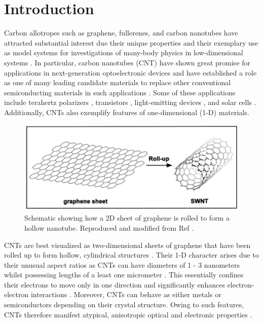 \chapter{Introduction}

Carbon allotropes such as graphene, fullerenes, and carbon nanotubes have attracted substantial interest due their unique properties and their exemplary use as model systems for investigations of many-body physics in low-dimensional systems \cite{zaytseva2016carbon, nanot2012optoelectronic, soavi2016ultrafast}. In particular, carbon nanotubes (CNT) have shown great promise for applications in next-generation optoelectronic devices and have established a role as one of many leading candidate materials to replace other conventional semiconducting materials in such applications \cite{nanot2012optoelectronic}. Some of these applications include terahertz polarizers \cite{ren2009carbon}, transistors \cite{qiu2017scaling}, light-emitting devices \cite{liu2015electrically}, and solar cells \cite{kongkanand2007single}. Additionally, CNTs also exemplify features of one-dimensional (1-D) materials. 

\begin{figure}[H]
	\centering
	\includegraphics[scale=0.8]{images/chapter_intro/rolled_up_graphene.png}
	\caption{Schematic showing how a 2D sheet of graphene is rolled to form a hollow nanotube. Reproduced and modified from Ref \cite{odom2000structure}.}
\end{figure}

CNTs are best visualized as two-dimensional sheets of graphene that have been rolled up to form hollow, cylindrical structures \cite{odom2000structure,charlier2007electronic}. Their 1-D character arises due to their unusual aspect ratios as CNTs can have diameters of 1 - 3 nanometers whilst possessing lengths of a least one micrometer  \cite{zaytseva2016carbon, ando1997excitons}. This essentially confines their electrons to move only in one direction and significantly enhances electron-electron interactions \cite{ando1997excitons}. Moreover, CNTs can behave as either metals or semiconductors depending on their crystal structure. Owing to such features, CNTs therefore manifest atypical, anisotropic optical and electronic properties \cite{weismanKonoBook}. 


